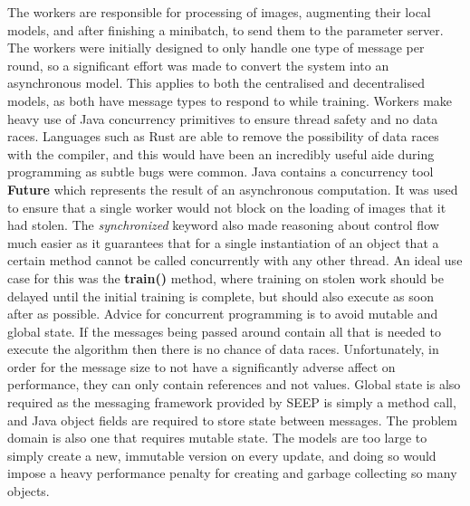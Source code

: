 \documentclass[12pt]{article}
\begin{document}
The workers are responsible for processing of images, augmenting their local models, and after finishing a minibatch, to send them to the parameter server. The workers were initially designed to only handle one type of message per round, so a significant effort was made to convert the system into an asynchronous model. This applies to both the centralised and decentralised models, as both have message types to respond to while training.
\newline
\newline
Workers make heavy use of Java concurrency primitives to ensure thread safety and no data races. Languages such as Rust are able to remove the possibility of data races with the compiler, and this would have been an incredibly useful aide during programming as subtle bugs were common. Java contains a concurrency tool \textbf{Future} which represents the result of an asynchronous computation. It was used to ensure that a single worker would not block on the loading of images that it had stolen. The \textit{synchronized} keyword also made reasoning about control flow much easier as it guarantees that for a single instantiation of an object that a certain method cannot be called concurrently with any other thread. An ideal use case for this was the \textbf{train()} method, where training on stolen work should be delayed until the initial training is complete, but should also execute as soon after as possible.
\newline
\newline
Advice for concurrent programming is to avoid mutable and global state. If the messages being passed around contain all that is needed to execute the algorithm then there is no chance of data races. Unfortunately, in order for the message size to not have a significantly adverse affect on performance, they can only contain references and not values. Global state is also required as the messaging framework provided by SEEP is simply a method call, and Java object fields are required to store state between messages. The problem domain is also one that requires mutable state. The models are too large to simply create a new, immutable version on every update, and doing so would impose a heavy performance penalty for creating and garbage collecting so many objects.
\end{document}
